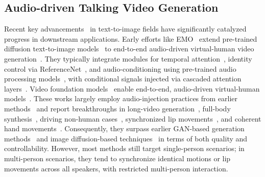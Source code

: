 \subsection{Audio-driven Talking Video Generation}
Recent key advancements~\cite{ho2020denoising, rombach2022high, ho2021classifier, zhang2023adding, peebles2023scalable} in text-to-image fields have significantly catalyzed progress in downstream applications. 
Early efforts like EMO~\cite{tian2024emo} extend pre-trained diffusion text-to-image models~\cite{rombach2022high} to end-to-end audio-driven virtual-human video generation~\cite{jiangloopy, chen2025echomimic, xu2024hallo, yee2025synchrorama, wang2024v, nazarieh2024portraittalk, lin2025cyberhost, chen2025midas}. 
They typically integrate modules for temporal attention~\cite{guoanimatediff}, identity control via ReferenceNet~\cite{zhu2023tryondiffusion, hu2024animate, kong2025profashion, zhang2025learning}, and audio-conditioning using pre-trained audio processing models~\cite{radford2023robust, baevski2020wav2vec, schneider2019wav2vec}, with conditional signals injected via cascaded attention layers~\cite{vaswani2017attention}. 
Video foundation models~\cite{blattmann2023stable, yangcogvideox, kong2024hunyuanvideo, wan2025wan, Zhang_2025_CVPR} enable end-to-end, audio-driven virtual-human models~\cite{meng2025echomimicv3, cui2025hallo3, ji2025sonic, tu2025stableavatar, lin2025omnihuman, yang2025infinitetalk, gao2025wan, jiang2025omnihuman}. 
These works largely employ audio-injection practices from earlier methods~\cite{tian2024emo, jiangloopy} and report breakthroughs in long-video generation~\cite{yang2025infinitetalk, cui2025hallo3}, full-body synthesis~\cite{lin2025omnihuman}, 
driving non-human cases~\cite{gao2025wan, gan2025omniavatar}, synchronized lip movements~\cite{ji2025sonic}, and coherent hand movements~\cite{meng2025echomimicv3}.
Consequently, they surpass earlier GAN-based generation methods~\cite{zhang2023sadtalker, xu2024vasa, guo2024liveportrait, zhang2024musetalk} and image diffusion-based techniques~\cite{rombach2022high, peebles2023scalable} in terms of both quality and controllability. 
However, most methods still target single-person scenarios; in multi-person scenarios, they tend to synchronize identical motions or lip movements across all speakers, with restricted multi-person interaction.

